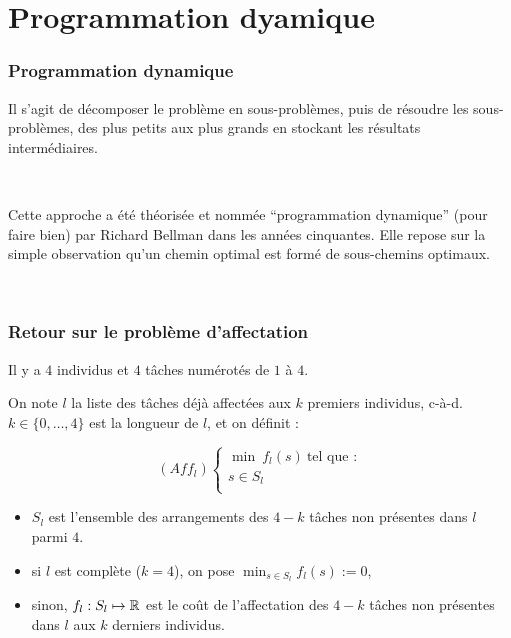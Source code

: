 \documentclass{beamer}
\newcommand{\R}{{\ensuremath\mathbb{R}}}
\begin{document}
\section{Programmation dyamique}

\begin{frame}
  \frametitle{Programmation dynamique}

  Il s'agit de décomposer le problème en sous-problèmes, puis de résoudre les sous-problèmes,
  des plus petits aux plus grands en stockant les résultats intermédiaires.

  ~
  
  Cette approche a été théorisée et nommée ``programmation dynamique'' (pour faire bien)
  par Richard Bellman dans les années cinquantes. Elle repose sur la simple observation
  qu'un chemin optimal est formé de sous-chemins optimaux.

  ~
  
\end{frame}
  
\begin{frame}
  \frametitle{Retour sur le problème d'affectation}

  Il y a $4$ individus et $4$ tâches numérotés de $1$ à $4$.
  
  On note $l$ la liste des tâches déjà affectées aux $k$
  premiers individus, c-à-d. $k \in \{0,\dots,4\}$ est
  la longueur de $l$, et on définit :  

  \[
  (Aff_l) \left\{
  \begin{array}{c}
    \min \ f_l(s) \ \text{tel que :} \\
    s \in S_l \\
  \end{array}
  \right.
  \]

  \begin{itemize}
  \item $S_l$ est l'ensemble des arrangements des $4-k$ tâches
    non présentes dans $l$ parmi $4$.  
  \item si $l$ est complète ($k = 4$), on pose $\min_{s \in S_l} f_l(s) := 0$,
  \item sinon, $f_l : S_l \mapsto \R$ est le coût de l'affectation
      des $4-k$ tâches non présentes dans $l$ aux $k$ derniers individus.
  \end{itemize}

\end{frame}
\end{document}

